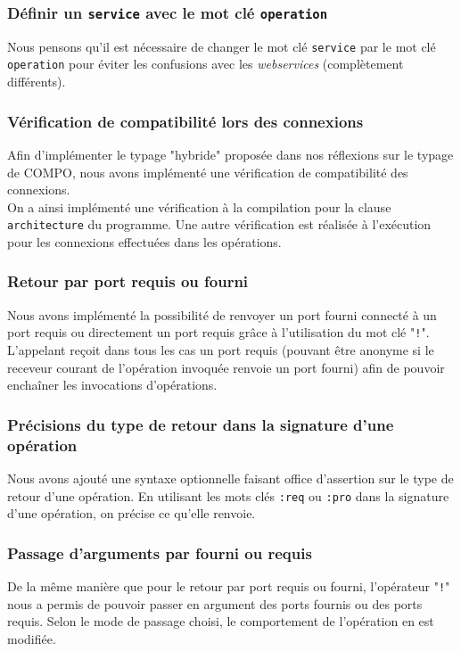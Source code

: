 \documentclass[11pt,a4paper,openany,oneside]{book}
\begin{document}
\subsubsection{Définir un \texttt{service} avec le mot clé \texttt{operation}}
Nous pensons qu'il est nécessaire de changer le mot clé \texttt{service} par le mot clé \texttt{operation} pour éviter les confusions avec les \textit{webservices} (complètement différents).

\subsubsection{Vérification de compatibilité lors des connexions}
Afin d'implémenter le typage "hybride" proposée dans nos réflexions sur le typage de COMPO, nous avons implémenté une vérification de compatibilité des connexions.\\
On a ainsi implémenté une vérification à la compilation pour la clause \texttt{architecture} du programme. Une autre vérification est réalisée à l'exécution pour les connexions effectuées dans les opérations.

\subsubsection{Retour par port requis ou fourni}
Nous avons implémenté la possibilité de renvoyer un port fourni connecté à un port requis ou directement un port requis grâce à l'utilisation du mot clé "\texttt{!}".\\
L'appelant reçoit dans tous les cas un port requis (pouvant être anonyme si le receveur courant de l'opération invoquée renvoie un port fourni) afin de pouvoir enchaîner les invocations d'opérations.

\subsubsection{Précisions du type de retour dans la signature d'une opération}
Nous avons ajouté une syntaxe optionnelle faisant office d'assertion sur le type de retour d'une opération. En utilisant les mots clés \texttt{:req} ou \texttt{:pro} dans la signature d'une opération, on précise ce qu'elle renvoie. 

\subsubsection{Passage d'arguments par fourni ou requis}
De la même manière que pour le retour par port requis ou fourni, l'opérateur "\texttt{!}" nous a permis de pouvoir passer en argument des ports fournis ou des ports requis. Selon le mode de passage choisi, le comportement de l'opération en est modifiée.
\end{document}
